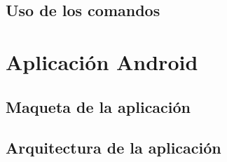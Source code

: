\subsection{Uso de los comandos}

\section{Aplicación Android}

\subsection{Maqueta de la aplicación}

\subsection{Arquitectura de la aplicación}




